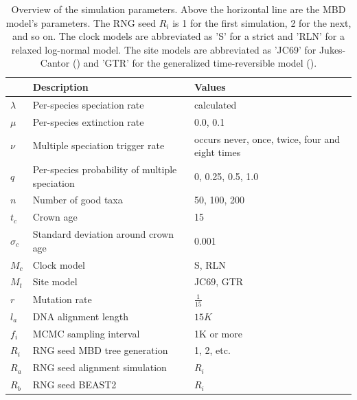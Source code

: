 \documentclass{article}
\begin{document}
\begin{table}
  \centering 
  \begin{tabular}{p{} p{} p{}}
    \hline
                          & Description & Values \\
    \hline
    \hline
    $\lambda$             & Per-species speciation rate & calculated \\
    $\mu$                 & Per-species extinction rate & 0.0, 0.1 \\
    $\nu$                 & Multiple speciation trigger rate & occurs never, once, twice, four and eight times \\
    $q$                   & Per-species probability of multiple speciation & 0, 0.25, 0.5, 1.0 \\
    \hline
    \hline
    $n$                   & Number of good taxa & 50, 100, 200 \\
    $t_c$                 & Crown age & 15 \\
    $\sigma_c$            & Standard deviation around crown age & 0.001 \\
    $M_c$                 & Clock model & S, RLN \\
    $M_t$                 & Site model & JC69, GTR \\
    $r$                   & Mutation rate & $\frac{1}{15}$ \\
    $l_a$                 & DNA alignment length & $15K$ \\
    $f_i$                 & MCMC sampling interval & 1K or more \\
    $R_i$                 & RNG seed MBD tree generation & 1, 2, etc. \\
    $R_a$                 & RNG seed alignment simulation & $R_i$ \\
    $R_b$                 & RNG seed BEAST2 & $R_i$ \\
    \hline
  \end{tabular}
  \caption{
    Overview of the simulation parameters. Above the horizontal line are 
    the MBD model's parameters. 
    The RNG seed $R_i$ is 1 for the first simulation, 2 for the next,
    and so on.  
    The clock models are abbreviated as 'S' for a strict and 'RLN' for a relaxed log-normal model.
    The site models are abbreviated as 'JC69' for Jukes-Cantor (\cite{jc69}) and 'GTR' for the generalized 
    time-reversible model (\cite{gtr}).
  }
  \label{table:parameters}
\end{table}
\end{document}
